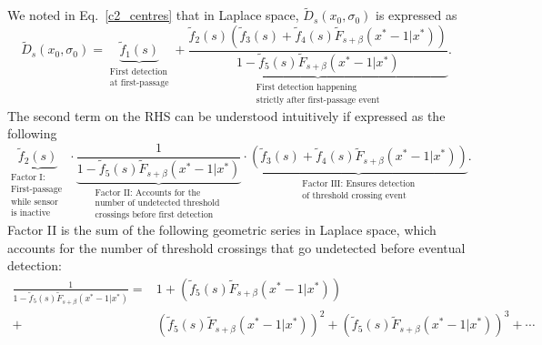 We noted in Eq.~\ref{c2_centres} that in Laplace space, $\widetilde{D}_s(x_0, \sigma_0)$ is expressed as
\begin{equation*}
    \widetilde{D}_s(x_0, \sigma_0) = \underbrace{\widetilde{f}_1(s)}_{\substack{\text{First detection}\\ \text{at first-passage}}} + \underbrace{\frac{ \widetilde{f}_2(s)\left(\widetilde{f}_3(s)+\widetilde{f}_4(s)\widetilde{F}_{s+\beta}(x^*-1|x^*)\right)}{1-\widetilde{f}_5(s)\widetilde{F}_{s+\beta}(x^*-1|x^*)}}_{\substack{\text{First detection happening}\\ \text{strictly after first-passage event}}}.
\end{equation*}
The second term on the RHS can be understood intuitively if expressed as the following
\begin{equation}
      \underbrace{ \widetilde{f}_2(s)}_{\substack{ \text{Factor I:} \\ \text{First-passage }\\ \text{while sensor} \\ \text{is inactive}}}\cdot \underbrace{ \frac{1}{1 -\widetilde{f}_5(s)\widetilde{F}_{s+\beta}(x^*-1|x^*) }}_{\substack{\text{Factor II: Accounts for the} \\ \text{number of undetected threshold }\\ \text{crossings before first detection}}}\cdot\underbrace{ \left(\widetilde{f}_3(s)+\widetilde{f}_4(s)\widetilde{F}_{s+\beta}(x^*-1|x^*)\right)}_{\substack{\text{Factor III: Ensures detection}\\ \text{of threshold crossing event}}}.
\end{equation}
Factor II is the sum of the following geometric series in Laplace space, which accounts for the number of threshold crossings that go undetected before eventual detection:
\begin{align}
    \nonumber \frac{1}{1 -\widetilde{f}_5(s)\widetilde{F}_{s+\beta}(x^*-1|x^*) } =   &1 + \left( \widetilde{f}_5(s)\widetilde{F}_{s+\beta}(x^*-1|x^*)\right) \\  +&\left( \widetilde{f}_5(s)\widetilde{F}_{s+\beta}(x^*-1|x^*)\right)^2 + \left( \widetilde{f}_5(s)\widetilde{F}_{s+\beta}(x^*-1|x^*)\right)^3 + \cdots 
\end{align}
